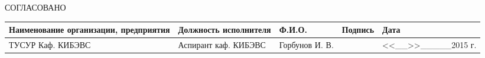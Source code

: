 \begin{center}
  СОГЛАСОВАНО
\end{center}

\begin{table}[ht]
\label{tab:agreed}
\begin{center}
\begin{tabularx}{\linewidth}{|X|X|X|X|X|}
\hline
Наименование организации, предприятия & Должность исполнителя & Ф.И.О. & Подпись & Дата\\
\hline
ТУСУР Каф. КИБЭВС & Аспирант каф. КИБЭВС & Горбунов И. В. & & <<\_\_>>\_\_\_\_\_2015 г. \\
\hline
\end{tabularx}
\end{center}
\end{table}
